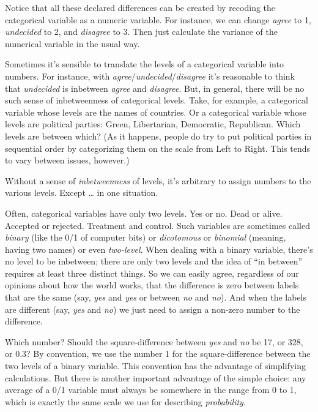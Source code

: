 \documentclass[]{tufte-book}
\begin{document}
Notice that all these declared differences can be created by recoding the categorical variable as a numeric variable. For instance, we can change \emph{agree} to 1, \emph{undecided} to 2, and \emph{disagree} to 3. Then just calculate the variance of the numerical variable in the usual way.

Sometimes it's sensible to translate the levels of a categorical variable into numbers. For instance, with \emph{agree}/\emph{undecided}/\emph{disagree} it's reasonable to think that \emph{undecided} is inbetween \emph{agree} and \emph{disagree}. But, in general, there will be no such sense of inbetweenness of categorical levels. Take, for example, a categorical variable whose levels are the names of countries. Or a categorical variable whose levels are political parties: Green, Libertarian, Democratic, Republican. Which levels are between which? (As it happens, people do try to put political parties in sequential order by categorizing them on the scale from Left to Right. This tends to vary between issues, however.)

Without a sense of \emph{inbetweenness} of levels, it's arbitrary to assign numbers to the various levels. Except \ldots{} in one situation.

Often, categorical variables have only two levels. Yes or no. Dead or alive. Accepted or rejected. Treatment and control. Such variables are sometimes called \emph{binary} (like the 0/1 of computer bits) or \emph{dicotomous} or \emph{binomial} (meaning, having two names) or even \emph{two-level}. When dealing with a binary variable, there's no level to be inbetween; there are only two levels and the idea of ``in between'' requires at least three distinct things. So we can easily agree, regardless of our opinions about how the world works, that the difference is zero between labels that are the same (say, \emph{yes} and \emph{yes} or between \emph{no} and \emph{no}). And when the labels are different (say, \emph{yes} and \emph{no}) we just need to assign a non-zero number to the difference.

Which number? Should the square-difference between \emph{yes} and \emph{no} be 17, or 328, or 0.3? By convention, we use the number 1 for the square-difference between the two levels of a binary variable. This convention has the advantage of simplifying calculations. But there is another important advantage of the simple choice: any average of a 0/1 variable must always be somewhere in the range from 0 to 1, which is exactly the same scale we use for describing \emph{probability}.
\end{document}
